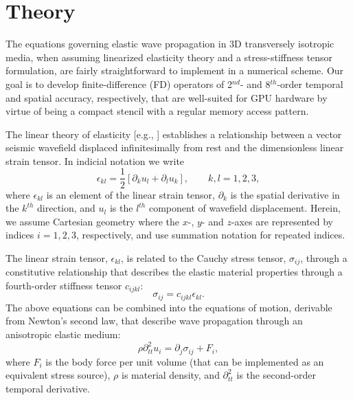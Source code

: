 \section{Theory}

The equations governing elastic wave propagation in 3D transversely isotropic media, when assuming linearized elasticity theory and a stress-stiffness tensor formulation, are fairly straightforward to implement in a numerical scheme.  Our goal is to develop finite-difference (FD) operators of 2$^{nd}$- and 8$^{th}$-order temporal and spatial accuracy, respectively, that are well-suited for GPU hardware by virtue of being a compact stencil with a regular memory access pattern.  

The linear theory of elasticity [e.g., \cite{Landau}] establishes a relationship between a vector seismic wavefield displaced infinitesimally from rest and the dimensionless linear strain tensor.  In indicial notation we write
\begin{equation} \label{eqn:strain}
\epsilon_{kl} = \frac{1}{2}\left[ \partial_k u_l + \partial_l u_k \right], \quad \quad k,l=1,2,3,
\end{equation}
where $\epsilon_{kl}$ is an element of the linear strain tensor, $\partial_k$ is the spatial derivative in the $k^{th}$ direction, and $u_l$ is the $l^{th}$ component of wavefield displacement.  Herein, we assume Cartesian geometry where the $x$-, $y$- and $z$-axes are represented by indices $i=1,2,3$, respectively, and use summation notation for repeated indices.  

The linear strain tensor, $\epsilon_{kl}$, is related to the Cauchy stress tensor, $\sigma_{ij}$, through a constitutive relationship that describes the elastic material properties through a fourth-order stiffness tensor $c_{ijkl}$:
\begin{equation} \label{eqn:constitutive}
\sigma_{ij}=c_{ijkl}\epsilon_{kl}.
\end{equation}
The above equations can be combined into the equations of motion, derivable from Newton's second law, that describe wave propagation through an anisotropic elastic medium:
\begin{equation}\label{eqn:EOM}
\rho \partial^2_{tt}u_i = \partial_j \sigma_{ij} + F_i,
\end{equation}
where $F_i$ is the body force per unit volume (that can be implemented as an equivalent stress source), $\rho$ is material density, and $\partial^2_{tt}$ is the second-order temporal derivative. 

